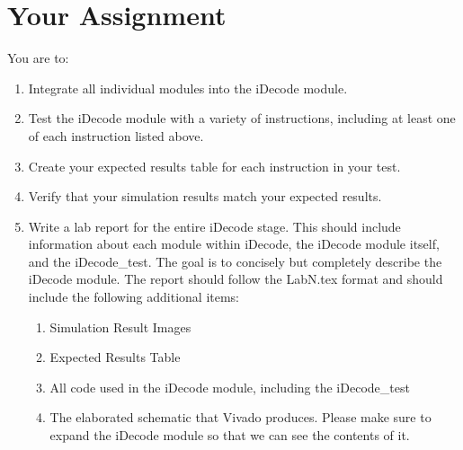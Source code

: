 \section{Your Assignment}

You are to:
\begin{enumerate}
\item Integrate all individual modules into the iDecode module.
\item Test the iDecode module with a variety of instructions, including at least one of each instruction listed above.
\item Create your expected results table for each instruction in your test. 
\item Verify that your simulation results match your expected results.
\item Write a lab report for the entire iDecode stage.  This should include information about each module within iDecode, the iDecode module itself, and the iDecode\_test.  The goal is to concisely but completely describe the iDecode module.  The report should follow the LabN.tex format and should include the following additional items:
\begin{enumerate}
	\item Simulation Result Images
	\item Expected Results Table
	\item All code used in the iDecode module, including the iDecode\_test
	\item The elaborated schematic that Vivado produces.  Please make sure to expand the iDecode module so that we can see the contents of it.
\end{enumerate}
\end{enumerate} 